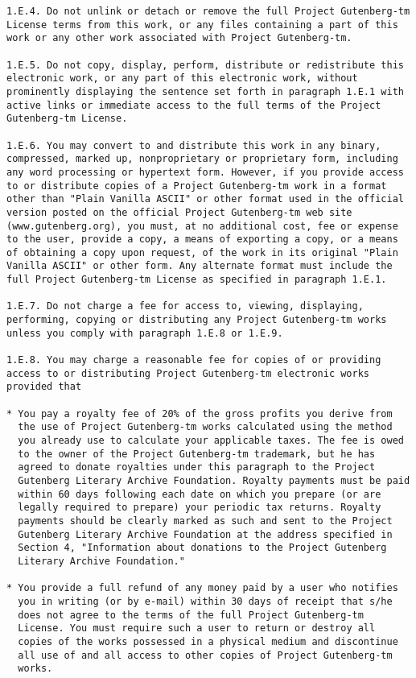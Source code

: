 \documentclass{book}[2021/07/26]
\begin{document}
\begin{mainmatter}
\begin{spacing}{1.3}
\begin{verbatim}
1.E.4. Do not unlink or detach or remove the full Project Gutenberg-tm
License terms from this work, or any files containing a part of this
work or any other work associated with Project Gutenberg-tm.

1.E.5. Do not copy, display, perform, distribute or redistribute this
electronic work, or any part of this electronic work, without
prominently displaying the sentence set forth in paragraph 1.E.1 with
active links or immediate access to the full terms of the Project
Gutenberg-tm License.

1.E.6. You may convert to and distribute this work in any binary,
compressed, marked up, nonproprietary or proprietary form, including
any word processing or hypertext form. However, if you provide access
to or distribute copies of a Project Gutenberg-tm work in a format
other than "Plain Vanilla ASCII" or other format used in the official
version posted on the official Project Gutenberg-tm web site
(www.gutenberg.org), you must, at no additional cost, fee or expense
to the user, provide a copy, a means of exporting a copy, or a means
of obtaining a copy upon request, of the work in its original "Plain
Vanilla ASCII" or other form. Any alternate format must include the
full Project Gutenberg-tm License as specified in paragraph 1.E.1.

1.E.7. Do not charge a fee for access to, viewing, displaying,
performing, copying or distributing any Project Gutenberg-tm works
unless you comply with paragraph 1.E.8 or 1.E.9.

1.E.8. You may charge a reasonable fee for copies of or providing
access to or distributing Project Gutenberg-tm electronic works
provided that

* You pay a royalty fee of 20% of the gross profits you derive from
  the use of Project Gutenberg-tm works calculated using the method
  you already use to calculate your applicable taxes. The fee is owed
  to the owner of the Project Gutenberg-tm trademark, but he has
  agreed to donate royalties under this paragraph to the Project
  Gutenberg Literary Archive Foundation. Royalty payments must be paid
  within 60 days following each date on which you prepare (or are
  legally required to prepare) your periodic tax returns. Royalty
  payments should be clearly marked as such and sent to the Project
  Gutenberg Literary Archive Foundation at the address specified in
  Section 4, "Information about donations to the Project Gutenberg
  Literary Archive Foundation."

* You provide a full refund of any money paid by a user who notifies
  you in writing (or by e-mail) within 30 days of receipt that s/he
  does not agree to the terms of the full Project Gutenberg-tm
  License. You must require such a user to return or destroy all
  copies of the works possessed in a physical medium and discontinue
  all use of and all access to other copies of Project Gutenberg-tm
  works.


\end{verbatim}
\end{spacing}
\end{mainmatter}
\end{document}
